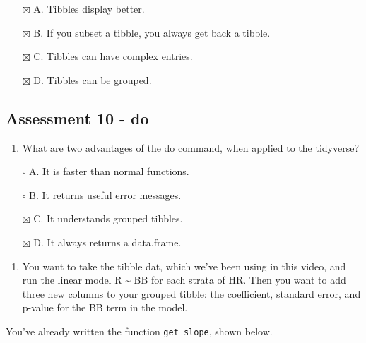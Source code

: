 \documentclass[
]{article}
\providecommand{\tightlist}{%
  \setlength{\itemsep}{0pt}\setlength{\parskip}{0pt}}
\begin{document}
\begin{itemize}
\tightlist
\item[$\boxtimes$]
  A. Tibbles display better.
\item[$\boxtimes$]
  B. If you subset a tibble, you always get back a tibble.
\item[$\boxtimes$]
  C. Tibbles can have complex entries.
\item[$\boxtimes$]
  D. Tibbles can be grouped.
\end{itemize}

\hypertarget{assessment-10---do}{%
\subsection{Assessment 10 - do}\label{assessment-10---do}}

\begin{enumerate}
\def\labelenumi{\arabic{enumi}.}
\tightlist
\item
  What are two advantages of the do command, when applied to the
  tidyverse?
\end{enumerate}

\begin{itemize}
\tightlist
\item[$\square$]
  A. It is faster than normal functions.
\item[$\square$]
  B. It returns useful error messages.
\item[$\boxtimes$]
  C. It understands grouped tibbles.
\item[$\boxtimes$]
  D. It always returns a data.frame.
\end{itemize}

\begin{enumerate}
\def\labelenumi{\arabic{enumi}.}
\setcounter{enumi}{1}
\tightlist
\item
  You want to take the tibble dat, which we've been using in this video,
  and run the linear model R \textasciitilde{} BB for each strata of HR.
  Then you want to add three new columns to your grouped tibble: the
  coefficient, standard error, and p-value for the BB term in the model.
\end{enumerate}

You've already written the function \texttt{get\_slope}, shown below.
\end{document}
